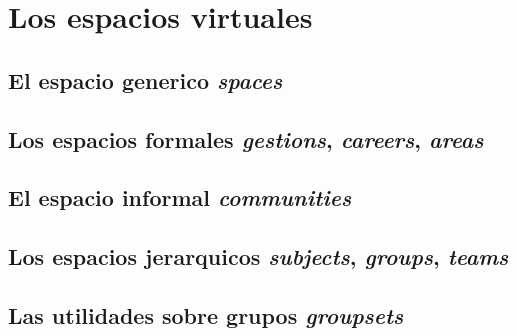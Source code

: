 \chapter{Los espacios virtuales}

\section{El espacio generico \emph{spaces}}
\section{Los espacios formales \emph{gestions}, \emph{careers}, \emph{areas}}
\section{El espacio informal \emph{communities}}
\section{Los espacios jerarquicos \emph{subjects}, \emph{groups}, \emph{teams}}
\section{Las utilidades sobre grupos \emph{groupsets}}